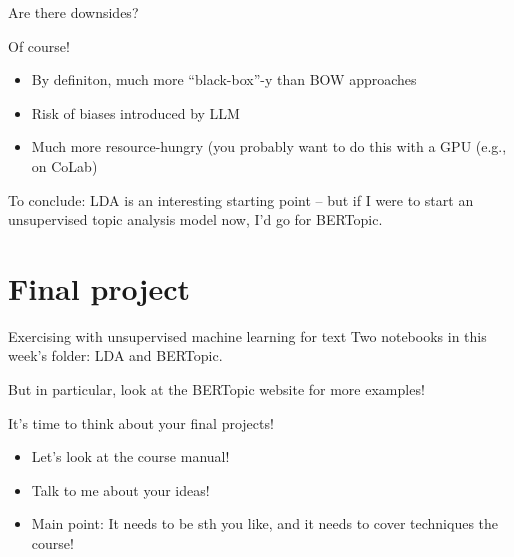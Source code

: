 	
	\begin{frame}{Are there downsides?}
	
	  Of course!
	
	  \begin{itemize}
	  \item By definiton, much more ``black-box''-y than BOW approaches
	  \item Risk of biases introduced by LLM
	  \item Much more resource-hungry (you probably want to do this with a GPU (e.g., on CoLab)
	  \end{itemize}
	\end{frame}
	
	
	\begin{frame}[standout]
	To conclude: LDA is an interesting starting point -- but if I were to start an unsupervised topic analysis model now, I'd go for BERTopic.
	
	\end{frame}
	
	

\section{Final project}
\begin{frame}{Exercising with unsupervised machine learning for text}
Two notebooks in this week's folder: LDA and BERTopic.

But in particular, look at the BERTopic website for more examples!
\end{frame}


\begin{frame}{It's time to think about your final projects!}
\begin{itemize}
\item Let's look at the course manual!
\item Talk to me about your ideas!
\item Main point: It needs to be sth you like, and it needs to cover techniques the course!
\end{itemize}
\end{frame}

\begin{frame}
	\printbibliography
\end{frame}


